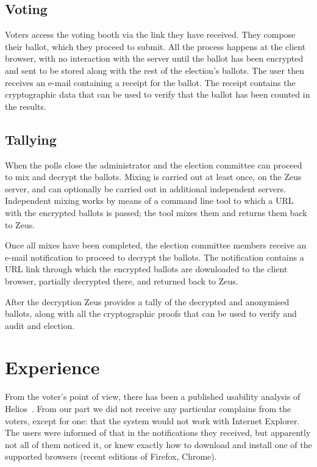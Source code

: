 \documentclass[letterpaper,twocolumn,10pt]{article}
\begin{document}
\subsection{Voting}

Voters access the voting booth via the link they have received. They
compose their ballot, which they proceed to submit. All the process
happens at the client browser, with no interaction with the server
until the ballot has been encrypted and sent to be stored along with
the rest of the election's ballots. The user then receives an e-mail
containing a receipt for the ballot. The receipt contains the
cryptographic data that can be used to verify that the ballot has been
counted in the results.

\subsection{Tallying}

When the polls close the administrator and the election committee can
proceed to mix and decrypt the ballots. Mixing is carried out at least
once, on the Zeus server, and can optionally be carried out in
additional independent servers. Independent mixing works by means of a
command line tool to which a URL with the encrypted ballots is passed;
the tool mixes them and returns them back to Zeus. 

Once all mixes have been completed, the election committee members
receive an e-mail notification to proceed to decrypt the ballots. The
notification contains a URL link through which the encrypted ballots
are downloaded to the client browser, partially decrypted there, and
returned back to Zeus.

After the decryption Zeus provides a tally of the decrypted and
anonymised ballots, along with all the cryptographic proofs that can
be used to verify and audit and election.


\section{Experience}

From the voter's point of view, there has been a published usability
analysis of Helios~\cite{karayumak:2011}. From our part we did not
receive any particular complains from the voters, except for one: that
the system would not work with Internet Explorer. The users were
informed of that in the notifications they received, but apparently
not all of them noticed it, or knew exactly how to download and
install one of the supported browsers (recent editions of Firefox,
Chrome).
\end{document}
